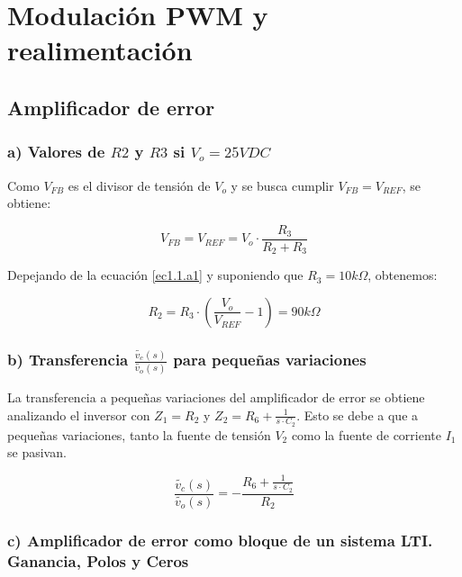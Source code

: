 \documentclass[e4_tp2_main.tex]{subfiles}
\begin{document}

\section{Modulación PWM y realimentación}

\subsection{Amplificador de error}

\subsubsection*{a) Valores de $R2$ y $R3$ si $V_o=25 VDC$}

Como $V_{FB}$ es el divisor de tensi\'on de $V_o$ y se busca cumplir $V_{FB}=V_{REF}$, se obtiene:

\begin{equation}
V_{FB}=V_{REF}= V_o \cdot \frac{R_3}{R_2+R_3} 
\label{ec1.1.a1}
\end{equation}


Depejando de la ecuaci\'on \eqref{ec1.1.a1} y suponiendo que $R_3=10k \Omega $, obtenemos:

\begin{equation}
R_2=R_3 \cdot \left( \frac{V_o}{V_{REF}} - 1 \right)=90k \Omega \label{ec1.1.a2}
\end{equation}

\subsubsection*{b) Transferencia  $\frac{ \widetilde{v_c}(s)}{\widetilde{v_o}(s)}$ para pequeñas variaciones} 

La transferencia a pequeñas variaciones del amplificador de error se obtiene analizando el inversor con $Z_1=R_2$ y $Z_2=R_6 + \frac{1}{s \cdot C_2}$. Esto se debe a que a pequeñas variaciones, tanto la fuente de tensi\'on $V_2$ como la fuente de corriente $I_1$ se pasivan.

\begin{equation}
\frac{\widetilde{v_c}(s)}{\widetilde{v_o}(s)}=-\frac{R_6 + \frac{1}{s \cdot C_2} }{R_2}  \label{ec1.1.b}
\end{equation}

\subsubsection*{c) Amplificador de error como bloque de un sistema LTI. Ganancia, Polos y Ceros}
\end{document}
